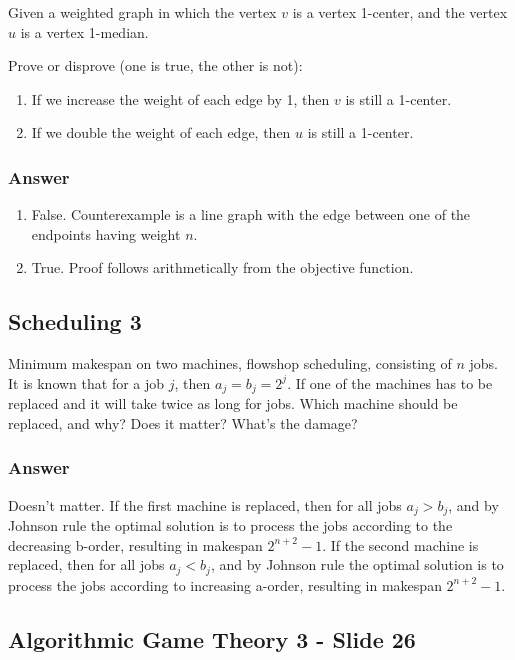 \documentclass{idc_msc}
\begin{document}
Given a weighted graph in which the vertex \(v\) is a vertex 1-center, and the vertex \(u\) is a vertex 1-median.

Prove or disprove (one is true, the other is not):

\begin{enumerate}
  \item If we increase the weight of each edge by 1, then \(v\) is still a 1-center.
  \item If we double the weight of each edge, then \(u\) is still a 1-center.
\end{enumerate}

\subsubsection{Answer}

\begin{enumerate}
  \item False. Counterexample is a line graph with the edge between one of the endpoints having weight \(n\).
  \item True. Proof follows arithmetically from the objective function.
\end{enumerate}

\subsection{Scheduling 3}

Minimum makespan on two machines, flowshop scheduling, consisting of \(n\) jobs.
It is known that for a job \(j\), then \(a_j=b_j=2^j\).
If one of the machines has to be replaced and it will take twice as long for jobs.
Which machine should be replaced, and why? Does it matter? What's the damage?

\subsubsection{Answer}

Doesn't matter.
If the first machine is replaced, then for all jobs \(a_j > b_j\), and by Johnson rule the optimal solution is to process the jobs according to the decreasing b-order, resulting in makespan \(2^{n+2}-1\).
If the second machine is replaced, then for all jobs \(a_j < b_j\), and by Johnson rule the optimal solution is to process the jobs according to increasing a-order, resulting in makespan \(2^{n+2}-1\).

\subsection{Algorithmic Game Theory 3 - Slide 26}
\end{document}
